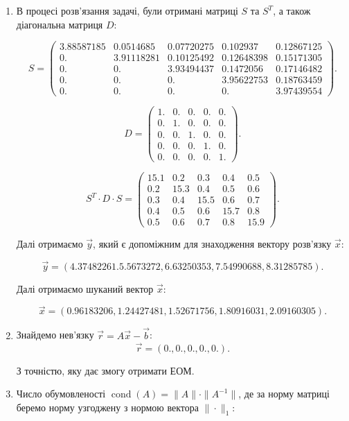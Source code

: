 \documentclass[12pt, a4paper]{article}
\theoremstyle{definition}
\DeclareMathOperator{\cond}{cond}
\numberwithin{equation}{section}
\begin{document}
\begin{enumerate}

\item В процесі розв’язання задачі, були отримані матриці $S$ та $S^T$, а також діагональна матриця $D$:

\[ S = \begin{pmatrix} 3.88587185 & 0.0514685 & 0.07720275 & 0.102937 & 0.12867125 \\ 0. & 3.91118281 & 0.10125492 & 0.12648398 & 0.15171305 \\ 0. & 0. & 3.93494437 & 0.1472056 & 0.17146482 \\ 0. & 0. & 0. & 3.95622753 & 0.18763459 \\ 0. & 0. & 0. & 0. & 3.97439554 \end{pmatrix}. \]

\[ D = \begin{pmatrix} 1. & 0. & 0. & 0. & 0. \\ 0. & 1. & 0. & 0. & 0. \\ 0. & 0. & 1. & 0. & 0. \\ 0. & 0. & 0. & 1. & 0. \\ 0. & 0. & 0. & 0. & 1. \end{pmatrix}. \]

\[ S^T \cdot D \cdot S = \begin{pmatrix} 15.1 & 0.2 & 0.3 & 0.4 & 0.5 \\ 0.2 & 15.3 & 0.4 & 0.5 & 0.6 \\ 0.3 & 0.4 & 15.5 & 0.6 & 0.7 \\ 0.4 & 0.5 & 0.6 & 15.7 & 0.8 \\ 0.5 & 0.6 & 0.7 & 0.8 & 15.9 \end{pmatrix}. \]

Далі отримаємо $\vec y$, який є допоміжним для знаходження вектору розв’язку $\vec x$:

\[ \vec y = (4.37482261. 5.5673272, 6.63250353, 7.54990688, 8.31285785). \]

Далі отримаємо шуканий вектор $\vec x$:

\[ \vec x = (0.96183206, 1.24427481, 1.52671756, 1.80916031, 2.09160305). \]

\item Знайдемо нев'язку $\vec r = A \vec x - \vec b$:
\[ \vec r = (0., 0., 0., 0., 0.). \]

З точністю, яку дає змогу отримати ЕОМ.  \\

\item Число обумовленості $\cond(A)=\|A\|\cdot\|A^{-1}\|$, де за норму матриці беремо норму  узгоджену з нормою вектора $\|\cdot\|_1$:


\end{enumerate}
\end{document}
